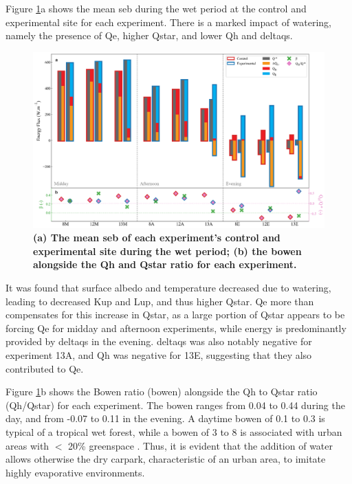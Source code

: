 \documentclass[final,3p,times,authoryear]{elsarticle}
\begin{document}
Figure \ref{fig:3.6}a shows the mean \gls{seb} during the wet period at the control and experimental site for each experiment. There is a marked impact of watering, namely the presence of \gls{Qe}, higher \gls{Qstar}, and lower \gls{Qh} and \gls{deltaqs}.

\begin{figure}
\centering
\includegraphics[trim={0 0 0 0},clip,scale=1.0]{pict017.png}
\caption{\bf (a) The mean \gls{seb} of each experiment's control and experimental site during the wet period; (b) the \gls{bowen} alongside the \gls{Qh} and \gls{Qstar} ratio for each experiment.}
 \label{fig:3.6}
\end{figure}

It was found that surface albedo and temperature decreased due to watering, leading to
decreased \gls{Kup} and \gls{Lup}, and thus higher \gls{Qstar}. \gls{Qe} more than compensates for this increase in \gls{Qstar}, as a large portion of \gls{Qstar} appears to be forcing \gls{Qe} for midday and afternoon experiments, while energy is predominantly provided by \gls{deltaqs} in the evening. \gls{deltaqs} was also notably negative for experiment 13A, and \gls{Qh} was negative for 13E, suggesting that they also contributed to \gls{Qe}.

Figure \ref{fig:3.6}b shows the Bowen ratio (\gls{bowen}) alongside the \gls{Qh} to \gls{Qstar} ratio (\gls{Qh}/\gls{Qstar}) for each experiment. The \gls{bowen} ranges from 0.04 to 0.44 during the day, and from -0.07 to 0.11 in the evening. A daytime \gls{bowen} of 0.1 to 0.3 is typical of a tropical wet forest, while a \gls{bowen} of 3 to 8 is associated with urban areas with $<$ 20\% greenspace \citep{Oke2017}. Thus, it is evident that the addition of water allows otherwise the dry carpark, characteristic of an urban area, to imitate highly evaporative environments.
\end{document}

